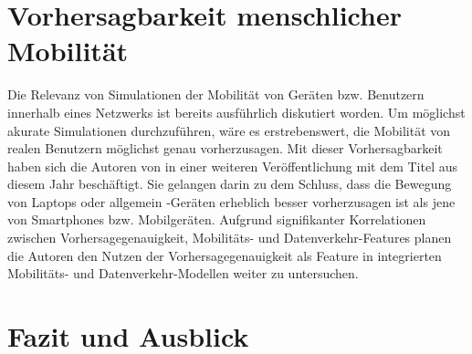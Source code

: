 \documentclass[12pt, a4paper]{article}
\begin{document}
\section{Vorhersagbarkeit menschlicher Mobilität}
\label{sec:mobility_predictability}
Die Relevanz von Simulationen der Mobilität von Geräten bzw. Benutzern innerhalb eines Netzwerks
ist bereits ausführlich diskutiert worden. Um möglichst akurate Simulationen durchzuführen, wäre es erstrebenswert,
die Mobilität von realen Benutzern möglichst genau vorherzusagen. Mit dieser Vorhersagbarkeit haben sich die Autoren
von \cite{Alipour2018} in einer weiteren Veröffentlichung mit dem Titel \cite{Alipour2019} aus diesem Jahr beschäftigt.
Sie gelangen darin zu dem Schluss, dass die Bewegung von Laptops oder allgemein -Geräten
erheblich besser vorherzusagen ist als jene von Smartphones bzw. Mobilgeräten.\newline
Aufgrund signifikanter Korrelationen zwischen Vorhersagegenauigkeit, Mobilitäts- und Datenverkehr-Features
planen die Autoren den Nutzen der Vorhersagegenauigkeit als Feature in integrierten Mobilitäts- und Datenverkehr-Modellen
weiter zu untersuchen.

\section{Fazit und Ausblick}
\label{sec:conclusion}
\end{document}
